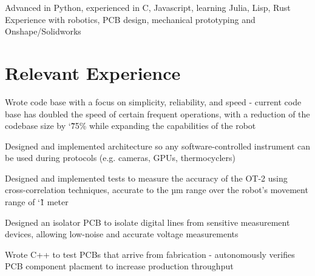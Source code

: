 \documentclass[]{deedy-resume-openfont}
\begin{document}

\begin{minipage}[t]{\textwidth}
	 Advanced in Python, experienced in C, Javascript, learning Julia, Lisp, Rust\\
   Experience with robotics, PCB design, mechanical prototyping and Onshape/Solidworks
\end{minipage}

\vspace{12pt}

\section{Relevant Experience}

\begin{tightemize}
    \item Wrote code base with a focus on simplicity, reliability, and speed - current code base has doubled the speed of certain frequent operations, with a reduction of the codebase size by \char`\~ 75\% while expanding the capabilities of the robot
    \item Designed and implemented architecture so any software-controlled instrument can be used during protocols (e.g. cameras, GPUs, thermocyclers)
    \item Designed and implemented tests to measure the accuracy of the OT-2 using cross-correlation techniques, accurate to the µm range over the robot's movement range of \char`\~ 1 meter
\end{tightemize}

\vspace{8pt}

\begin{tightemize}
    \item Designed an isolator PCB to isolate digital lines from sensitive measurement devices, allowing low-noise and accurate voltage measurements
    \item Wrote C++ to test PCBs that arrive from fabrication - autonomously verifies PCB component placment to increase production throughput
\end{tightemize}
\end{document}
